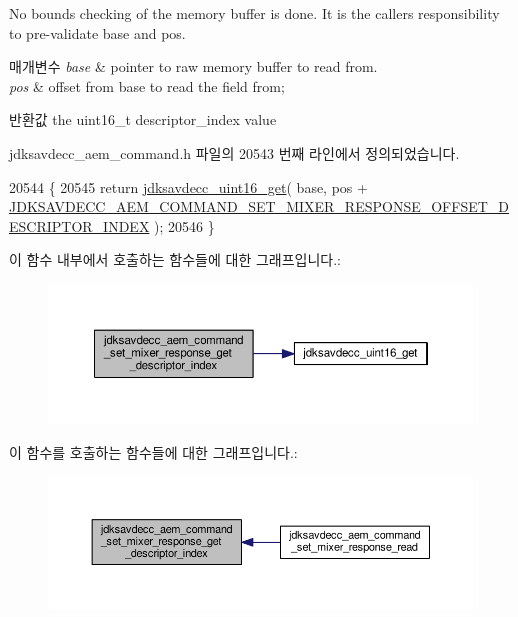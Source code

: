 No bounds checking of the memory buffer is done. It is the caller\textquotesingle{}s responsibility to pre-\/validate base and pos.


\begin{DoxyParams}{매개변수}
{\em base} & pointer to raw memory buffer to read from. \\
\hline
{\em pos} & offset from base to read the field from; \\
\hline
\end{DoxyParams}
\begin{DoxyReturn}{반환값}
the uint16\+\_\+t descriptor\+\_\+index value 
\end{DoxyReturn}


jdksavdecc\+\_\+aem\+\_\+command.\+h 파일의 20543 번째 라인에서 정의되었습니다.


\begin{DoxyCode}
20544 \{
20545     \textcolor{keywordflow}{return} \hyperlink{group__endian_ga3fbbbc20be954aa61e039872965b0dc9}{jdksavdecc\_uint16\_get}( base, pos + 
      \hyperlink{group__command__set__mixer__response_ga3f9fa36616757c3063295c00f5facf06}{JDKSAVDECC\_AEM\_COMMAND\_SET\_MIXER\_RESPONSE\_OFFSET\_DESCRIPTOR\_INDEX}
       );
20546 \}
\end{DoxyCode}


이 함수 내부에서 호출하는 함수들에 대한 그래프입니다.\+:
\nopagebreak
\begin{figure}[H]
\begin{center}
\leavevmode
\includegraphics[width=350pt]{group__command__set__mixer__response_ga817f166402231e460d04805cca712c23_cgraph}
\end{center}
\end{figure}




이 함수를 호출하는 함수들에 대한 그래프입니다.\+:
\nopagebreak
\begin{figure}[H]
\begin{center}
\leavevmode
\includegraphics[width=350pt]{group__command__set__mixer__response_ga817f166402231e460d04805cca712c23_icgraph}
\end{center}
\end{figure}


